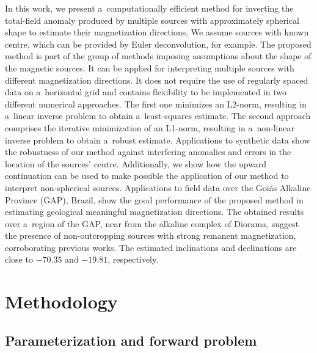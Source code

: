 \documentclass[journal abbreviation, npg]{copernicus}
\begin{document}
In this work, we present a~computationally efficient method for inverting the
total-field anomaly produced by multiple sources with approximately spherical
shape to estimate their magnetization directions. We assume sources with
known centre, which can be provided by Euler deconvolution, for example. The
proposed method is part of the group of methods imposing assumptions about
the shape of the magnetic sources. It can be applied for interpreting
multiple sources with different magnetization directions. It does not require
the use of regularly spaced data on a~horizontal grid and contains
flexibility to be implemented in two different numerical approaches. The
first one minimizes an L2-norm, resulting in a~linear inverse problem to
obtain a~least-squares estimate. The second approach comprises the iterative
minimization of an L1-norm, resulting in a~non-linear inverse problem to
obtain a~robust estimate. Applications to synthetic data show the robustness
of our method against interfering anomalies and errors in the location of the
sources' centre. Additionally, we show how the upward continuation can be
used to make possible the application of our method to interpret
non-spherical sources. Applications to field data over the Goi\'{a}s Alkaline
Province (GAP), Brazil, show the good performance of the proposed method in
estimating geological meaningful magnetization directions. The obtained
results over a~region of the GAP, near from the alkaline complex of Diorama,
suggest the presence of non-outcropping sources with strong remanent
magnetization, corroborating previous works. The estimated inclinations and
declinations are close to $-70.35${\degree} and $-19.81${\degree},
respectively.

\section{Methodology}

\subsection{Parameterization and forward problem}
\end{document}
